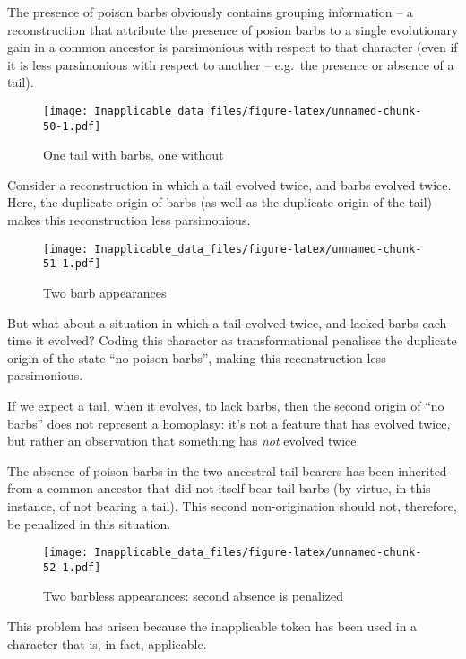 \documentclass[]{book}
\theoremstyle{definition}
\theoremstyle{definition}
\theoremstyle{definition}
\theoremstyle{remark}
\begin{document}
The presence of poison barbs obviously contains grouping information --
a reconstruction that attribute the presence of posion barbs to a single
evolutionary gain in a common ancestor is parsimonious with respect to
that character (even if it is less parsimonious with respect to another
-- e.g.~the presence or absence of a tail).

\begin{figure}
\centering
\texttt{[image: Inapplicable\_data\_files/figure-latex/unnamed-chunk-50-1.pdf]}
\caption{\label{fig:unnamed-chunk-50}One tail with barbs, one without}
\end{figure}

Consider a reconstruction in which a tail evolved twice, and barbs
evolved twice. Here, the duplicate origin of barbs (as well as the
duplicate origin of the tail) makes this reconstruction less
parsimonious.

\begin{figure}
\centering
\texttt{[image: Inapplicable\_data\_files/figure-latex/unnamed-chunk-51-1.pdf]}
\caption{\label{fig:unnamed-chunk-51}Two barb appearances}
\end{figure}

But what about a situation in which a tail evolved twice, and lacked
barbs each time it evolved? Coding this character as transformational
penalises the duplicate origin of the state ``no poison barbs'', making
this reconstruction less parsimonious.

If we expect a tail, when it evolves, to lack barbs, then the second
origin of ``no barbs'' does not represent a homoplasy: it's not a
feature that has evolved twice, but rather an observation that something
has \emph{not} evolved twice.

The absence of poison barbs in the two ancestral tail-bearers has been
inherited from a common ancestor that did not itself bear tail barbs (by
virtue, in this instance, of not bearing a tail). This second
non-origination should not, therefore, be penalized in this situation.

\begin{figure}
\centering
\texttt{[image: Inapplicable\_data\_files/figure-latex/unnamed-chunk-52-1.pdf]}
\caption{\label{fig:unnamed-chunk-52}Two barbless appearances: second
absence is penalized}
\end{figure}

This problem has arisen because the inapplicable token has been used in
a character that is, in fact, applicable.
\end{document}
